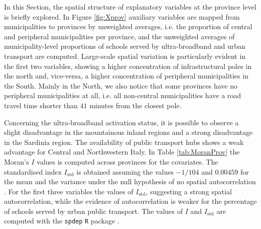 \documentclass[openany]{book}
\begin{document}
In this Section, the spatial structure of explanatory variables at the province level is briefly explored.
In Figure \ref{fig:Xprov} auxiliary variables are mapped from municipalities to provinces by unweighted averages, i.e. the proportion of central and peripheral municipalities per province, and the unweighted averages of municipality-level proportions of schools served by ultra-broadband and urban transport are computed. Large-scale spatial variation is particularly evident in the first two variables, showing a higher concentration of infrastructural poles in the north and, vice-versa, a higher concentration of peripheral municipalities in the South. Mainly in the North, we also notice that some provinces have no peripheral municipalities at all, i.e. all non-central municipalities have a road travel time shorter than $41$ minutes \citep{InnerAreas} from the closest pole.

Concerning the ultra-broadband activation status, it is possible to observe a slight disadvantage in the mountainous inland regions and a strong disadvantage in the Sardinia region. The availability of public transport hubs shows a weak advantage for Central and Northwestern Italy.
In Table \ref{tab:MoranProv} the Moran's $I$ values is computed across provinces for the covariates. The standardised index $I_\mathrm{std}$ is obtained assuming the values $-1/104$ and $0.00459$ for the mean and the variance under the null hypothesis of no spatial autocorrelation \citep{Cliff_Ord}. For the first three variables the values of $I_\mathrm{std}$, suggesting a strong spatial autocorrelation, while the evidence of autocorrelation is weaker for the percentage of schools served by urban public transport.
The values of $I$ and $I_\mathrm{std}$ are computed with the \texttt{spdep} \texttt{R} package \citep{spdep}. 
\end{document}
